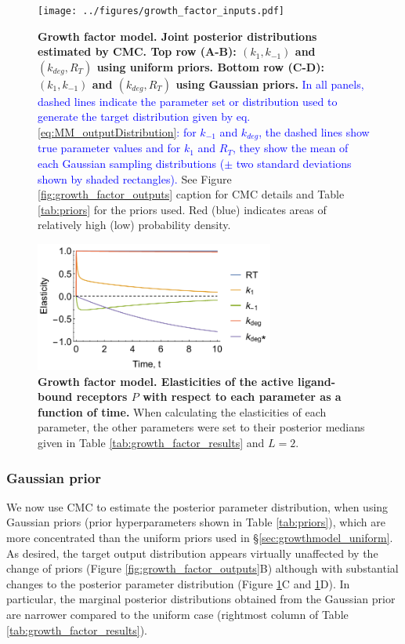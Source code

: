 \begin{figure}[H]
	\centerline{\texttt{[image: ../figures/growth\_factor\_inputs.pdf]}}
	\caption{\textbf{Growth factor model. Joint posterior distributions estimated by CMC. Top row (A-B): $(k_1,k_{-1})$ and $(k_{deg},R_T)$ using uniform priors. Bottom row (C-D): $(k_1,k_{-1})$ and $(k_{deg},R_T)$ using Gaussian priors.} \textcolor{blue}{In all panels, dashed lines indicate the parameter set or distribution used to generate the target distribution given by eq. \eqref{eq:MM_outputDistribution}: for $k_{-1}$ and $k_{deg}$, the dashed lines show true parameter values and for $k_1$ and $R_T$, they show the mean of each Gaussian sampling distributions ($\pm$ two standard deviations shown by shaded rectangles).} See Figure \ref{fig:growth_factor_outputs} caption for CMC details and Table \ref{tab:priors} for the priors used. Red (blue) indicates areas of relatively high (low) probability density.}
	\label{fig:growth_factor_inputs}
\end{figure}

\begin{figure}[H]
	\centerline{\includegraphics[width=0.7\textwidth]{../figures/dixit_elasticities.pdf}}
	\caption{\textbf{Growth factor model. Elasticities of the active ligand-bound receptors $P$ with respect to each parameter as a function of time.} When calculating the elasticities of each parameter, the other parameters were set to their posterior medians given in Table \ref{tab:growth_factor_results} and $L=2$.}
	\label{fig:dixit_elasticities}
\end{figure}

\subsubsection{Gaussian prior}
We now use CMC to estimate the posterior parameter distribution, when using Gaussian priors (prior hyperparameters shown in Table \ref{tab:priors}), which are more concentrated than the uniform priors used in \S\ref{sec:growthmodel_uniform}. As desired, the target output distribution appears virtually unaffected by the change of priors (Figure \ref{fig:growth_factor_outputs}B) although with substantial changes to the posterior parameter distribution (Figure \ref{fig:growth_factor_inputs}C and \ref{fig:growth_factor_inputs}D). In particular, the marginal posterior distributions obtained from the Gaussian prior are narrower compared to the uniform case (rightmost column of Table \ref{tab:growth_factor_results}).

